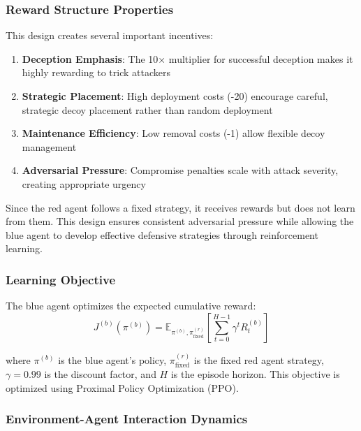 \documentclass[12pt,oneside]{article}
\begin{document}
\subsubsection{Reward Structure Properties}

This design creates several important incentives:
\begin{enumerate}
\item \textbf{Deception Emphasis}: The 10× multiplier for successful deception makes it highly rewarding to trick attackers
\item \textbf{Strategic Placement}: High deployment costs (-20) encourage careful, strategic decoy placement rather than random deployment
\item \textbf{Maintenance Efficiency}: Low removal costs (-1) allow flexible decoy management
\item \textbf{Adversarial Pressure}: Compromise penalties scale with attack severity, creating appropriate urgency
\end{enumerate}

Since the red agent follows a fixed strategy, it receives rewards but does not learn from them. This design ensures consistent adversarial pressure while allowing the blue agent to develop effective defensive strategies through reinforcement learning.

\subsubsection{Learning Objective}

The blue agent optimizes the expected cumulative reward:
\begin{equation}
J^{(b)}(\pi^{(b)}) = \mathbb{E}_{\pi^{(b)}, \pi^{(r)}_{\text{fixed}}}\left[\sum_{t=0}^{H-1} \gamma^t R_t^{(b)}\right]
\end{equation}

where $\pi^{(b)}$ is the blue agent's policy, $\pi^{(r)}_{\text{fixed}}$ is the fixed red agent strategy, $\gamma = 0.99$ is the discount factor, and $H$ is the episode horizon. This objective is optimized using Proximal Policy Optimization (PPO).

\subsubsection{Environment-Agent Interaction Dynamics}
\end{document}
